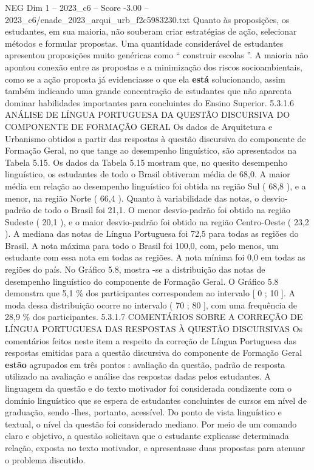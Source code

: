 \begin{textsample}{NEG Dim 1 – 2023\_c6 – Score -3.00 – 2023\_c6/enade\_2023\_arqui\_urb\_f2c5983230.txt}
Quanto às proposições, os estudantes, em sua maioria, não souberam criar estratégias de ação, selecionar métodos e formular propostas.
Uma quantidade considerável de estudantes apresentou proposições muito genéricas como “ construir escolas ”.
A maioria não apontou conexão entre as propostas e a minimização dos riscos socioambientais, como se a ação proposta já evidenciasse o que ela \textbf{está} solucionando, assim também indicando uma grande concentração de estudantes que não aparenta dominar habilidades importantes para concluintes do Ensino Superior. 5.3.1.6 ANÁLISE DE LÍNGUA PORTUGUESA DA QUESTÃO DISCURSIVA DO COMPONENTE DE FORMAÇÃO GERAL Os dados de Arquitetura e Urbanismo obtidos a partir das respostas à questão discursiva do componente de Formação Geral, no que tange ao desempenho linguístico, são apresentados na Tabela 5.15.
Os dados da Tabela 5.15 mostram que, no quesito desempenho linguístico, os estudantes de todo o Brasil obtiveram média de 68,0.
A maior média em relação ao desempenho linguístico foi obtida na região Sul ( 68,8 ), e a menor, na região Norte ( 66,4 ).
Quanto à variabilidade das notas, o desvio-padrão de todo o Brasil foi 21,1.
O menor desvio-padrão foi obtido na região Sudeste ( 20,1 ), e o maior desvio-padrão foi obtido na região Centro-Oeste ( 23,2 ).
A mediana das notas de Língua Portuguesa foi 72,5 para todas as regiões do Brasil.
A nota máxima para todo o Brasil foi 100,0, com, pelo menos, um estudante com essa nota em todas as regiões.
A nota mínima foi 0,0 em todas as regiões do país.
No Gráfico 5.8, mostra -se a distribuição das notas de desempenho linguístico do componente de Formação Geral.
O Gráfico 5.8 demonstra que 5,1 \% dos participantes correspondem ao intervalo [ 0 ; 10 ].
A moda dessa distribuição ocorre no intervalo ( 70 ; 80 ], com uma frequência de 28,9 \% dos participantes. 5.3.1.7 COMENTÁRIOS SOBRE A CORREÇÃO DE LÍNGUA PORTUGUESA DAS RESPOSTAS À QUESTÃO DISCURSIVAS Os comentários feitos neste item a respeito da correção de Língua Portuguesa das respostas emitidas para a questão discursiva do componente de Formação Geral \textbf{estão} agrupados em três pontos : avaliação da questão, padrão de resposta utilizado na avaliação e análise das respostas dadas pelos estudantes.
A linguagem da questão e do texto motivador foi considerada condizente com o domínio linguístico que se espera de estudantes concluintes de cursos em nível de graduação, sendo -lhes, portanto, acessível.
Do ponto de vista linguístico e textual, o nível da questão foi considerado mediano.
Por meio de um comando claro e objetivo, a questão solicitava que o estudante explicasse determinada relação, exposta no texto motivador, e apresentasse duas propostas para atenuar o problema discutido.

\end{textsample}
